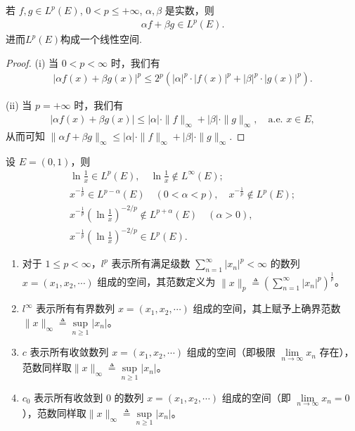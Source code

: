 \documentclass[../../main.tex]{subfiles}%
\begin{document}
\begin{theorem}
若 $f,g\in L^p(E)$, $0 < p \leqslant +\infty$, $\alpha,\beta$ 是实数，则
\begin{align*}
\alpha f + \beta g \in L^p(E).
\end{align*}
进而$L^p(E)$构成一个线性空间.
\end{theorem}
\begin{proof}
(i) 当 $0 < p < \infty$ 时，我们有
\begin{align*}
|\alpha f(x) + \beta g(x)|^p \leqslant 2^p(|\alpha|^p \cdot |f(x)|^p + |\beta|^p \cdot |g(x)|^p).
\end{align*}

(ii) 当 $p = +\infty$ 时，我们有
\begin{align*}
|\alpha f(x) + \beta g(x)| \leqslant |\alpha| \cdot \|f\|_\infty + |\beta| \cdot \|g\|_\infty,\quad \text{a.e. } x\in E,
\end{align*}
从而可知 $\|\alpha f + \beta g\|_\infty \leqslant |\alpha| \cdot \|f\|_\infty + |\beta| \cdot \|g\|_\infty$.
\end{proof}

\begin{example}
设 $E=(0,1)$，则
\begin{gather*}
\ln\frac{1}{x} \in L^p(E),\quad \ln\frac{1}{x} \notin L^\infty(E); \\
x^{-\frac{1}{p}} \in L^{p-\alpha}(E)\quad (0 < \alpha < p),\quad x^{-\frac{1}{p}} \notin L^p(E); \\
x^{-\frac{1}{p}}\left(\ln\frac{1}{x}\right)^{-2/p} \notin L^{p+\alpha}(E)\quad (\alpha > 0), \\
x^{-\frac{1}{p}}\left(\ln\frac{1}{x}\right)^{-2/p} \in L^p(E).
\end{gather*}
\end{example}

\begin{definition}
\begin{enumerate}[(1)]
\item 对于 \(1 \leqslant p < \infty\)，\(l^p\) 表示所有满足级数 \(\sum\limits_{n=1}^{\infty} |x_n|^p < \infty\) 的数列 \(x=(x_1,x_2,\cdots)\) 组成的空间，其范数定义为 \(\|x\|_p \triangleq \left( \sum\limits_{n=1}^{\infty} |x_n|^p \right)^{\frac{1}{p}}\)。

\item \(l^{\infty}\) 表示所有有界数列 \(x=(x_1,x_2,\cdots)\) 组成的空间，其上赋予上确界范数 \(\|x\|_{\infty} \triangleq \sup\limits_{n \geqslant 1} |x_n|\)。

\item \(c\) 表示所有收敛数列 \(x=(x_1,x_2,\cdots)\) 组成的空间（即极限 \(\lim\limits_{n \to \infty} x_n\) 存在），范数同样取\(\|x\|_{\infty} \triangleq \sup\limits_{n \geqslant 1} |x_n|\)。

\item \(c_0\) 表示所有收敛到 \(0\) 的数列 \(x=(x_1,x_2,\cdots)\) 组成的空间（即 \(\lim\limits_{n \to \infty} x_n = 0\)），范数同样取\(\|x\|_{\infty} \triangleq \sup\limits_{n \geqslant 1} |x_n|\)。
\end{enumerate}
\end{definition}
\end{document}
